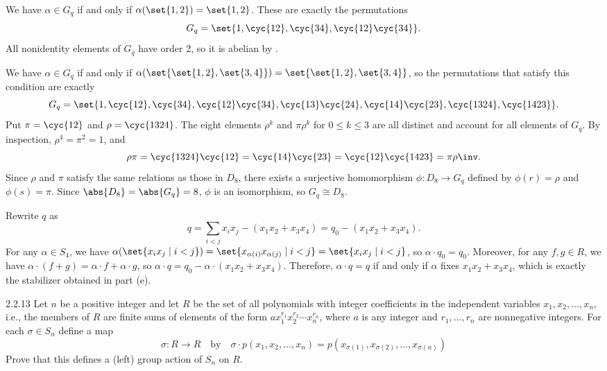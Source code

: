 \begin{sol}
\begin{subexercises}
        \item We have $\alpha \in G_q$ if and only if $\alpha(\set{1, 2}) = \set{1, 2}$.
        These are exactly the permutations
        \[
            G_q = \set{1, \cyc{1 2}, \cyc{3 4}, \cyc{1 2}\cyc{3 4}}.
        \]
        All nonidentity elements of $G_q$ have order 2, so it is abelian by .
        \item We have $\alpha \in G_q$ if and only if $\alpha(\set{\set{1, 2}, \set{3, 4}}) = \set{\set{1, 2}, \set{3, 4}}$, so the permutations that satisfy this condition are exactly
        \[
            G_q = \set{1, \cyc{1 2}, \cyc{3 4}, \cyc{1 2}\cyc{3 4}, \cyc{1 3}\cyc{2 4}, \cyc{1 4}\cyc{2 3}, \cyc{1 3 2 4}, \cyc{1 4 2 3}}.
        \]
        Put $\pi = \cyc{1 2}$ and $\rho = \cyc{1 3 2 4}$.
        The eight elements $\rho^k$ and $\pi \rho^k$ for $0 \leq k \leq 3$ are all distinct and account for all elements of $G_q$.
        By inspection, $\rho^4 = \pi^2 = 1$, and
        \[
            \rho \pi = \cyc{1 3 2 4}\cyc{1 2} = \cyc{1 4}\cyc{2 3} = \cyc{1 2}\cyc{1 4 2 3} = \pi \rho\inv.
        \]
        Since $\rho$ and $\pi$ satisfy the same relations as those in $D_8$, there exists a surjective homomorphism $\phi \colon D_8 \to G_q$ defined by $\phi(r) = \rho$ and $\phi(s) = \pi$.
        Since $\abs{D_8} = \abs{G_q} = 8$, $\phi$ is an isomorphism, so $G_q \cong D_8$.
        \item Rewrite $q$ as 
        \[
            q = \sum_{i < j} x_ix_j - (x_1x_2 + x_3x_4) = q_0 - (x_1x_2 + x_3x_4).
        \]
        For any $\alpha \in S_4$, we have $\alpha(\set{x_ix_j \mid i < j}) = \set{x_{\alpha(i)}x_{\alpha(j)} \mid i < j} = \set{x_ix_j \mid i < j}$, so $\alpha \cdot q_0 = q_0$.
        Moreover, for any $f, g \in R$, we have $\alpha \cdot(f + g) = \alpha \cdot f + \alpha \cdot g$, so $\alpha \cdot q = q_0 - \alpha \cdot (x_1x_2 + x_3x_4)$.
        Therefore, $\alpha \cdot q = q$ if and only if $\alpha$ fixes $x_1x_2 + x_3x_4$, which is exactly the stabilizer obtained in part (e). \qedhere
    \end{subexercises}
\end{sol}

\begin{exercise}{2.2.13}
    Let $n$ be a positive integer and let $R$ be the set of all polynomials with integer coefficients in the independent variables $x_1, x_2, \ldots, x_n$, i.e., the members of $R$ are finite sums of elements of the form $ax_1^{r_1}x_2^{r_2} \cdots x_n^{r_n}$, where $a$ is any integer and $r_1, \ldots, r_n$ are nonnegative integers.
	For each $\sigma \in S_n$ define a map
    \[
    	\sigma \colon R \to R \quad \text{by} \quad \sigma \cdot p(x_1, x_2, \ldots, x_n) = p(x_{\sigma(1)}, x_{\sigma(2)}, \ldots, x_{\sigma(n)})
    \]
    Prove that this defines a (left) group action of $S_n$ on $R$.
\end{exercise}

